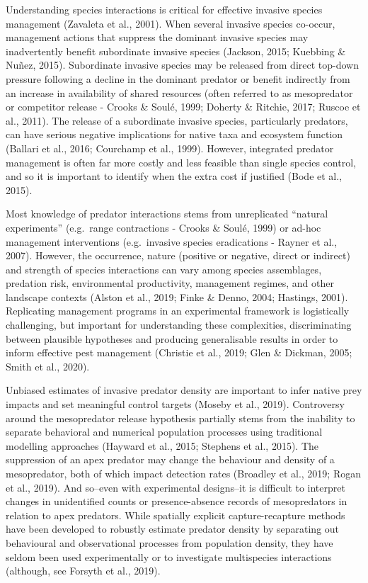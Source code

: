 \documentclass[]{elsarticle} %
\begin{document}
Understanding species interactions is critical for effective invasive species management (Zavaleta et al., 2001). When several invasive species co-occur, management actions that suppress the dominant invasive species may inadvertently benefit subordinate invasive species (Jackson, 2015; Kuebbing \& Nuñez, 2015). Subordinate invasive species may be released from direct top-down pressure following a decline in the dominant predator or benefit indirectly from an increase in availability of shared resources (often referred to as mesopredator or competitor release - Crooks \& Soulé, 1999; Doherty \& Ritchie, 2017; Ruscoe et al., 2011). The release of a subordinate invasive species, particularly predators, can have serious negative implications for native taxa and ecosystem function (Ballari et al., 2016; Courchamp et al., 1999). However, integrated predator management is often far more costly and less feasible than single species control, and so it is important to identify when the extra cost if justified (Bode et al., 2015).

Most knowledge of predator interactions stems from unreplicated ``natural experiments'' (e.g.~range contractions - Crooks \& Soulé, 1999) or ad-hoc management interventions (e.g.~invasive species eradications - Rayner et al., 2007). However, the occurrence, nature (positive or negative, direct or indirect) and strength of species interactions can vary among species assemblages, predation risk, environmental productivity, management regimes, and other landscape contexts (Alston et al., 2019; Finke \& Denno, 2004; Hastings, 2001). Replicating management programs in an experimental framework is logistically challenging, but important for understanding these complexities, discriminating between plausible hypotheses and producing generalisable results in order to inform effective pest management (Christie et al., 2019; Glen \& Dickman, 2005; Smith et al., 2020).

Unbiased estimates of invasive predator density are important to infer native prey impacts and set meaningful control targets (Moseby et al., 2019). Controversy around the mesopredator release hypothesis partially stems from the inability to separate behavioral and numerical population processes using traditional modelling approaches (Hayward et al., 2015; Stephens et al., 2015). The suppression of an apex predator may change the behaviour and density of a mesopredator, both of which impact detection rates (Broadley et al., 2019; Rogan et al., 2019). And so--even with experimental designs--it is difficult to interpret changes in unidentified counts or presence-absence records of mesopredators in relation to apex predators. While spatially explicit capture-recapture methods have been developed to robustly estimate predator density by separating out behavioural and observational processes from population density, they have seldom been used experimentally or to investigate multispecies interactions (although, see Forsyth et al., 2019).
\end{document}
